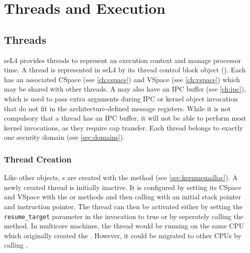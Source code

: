 %
%
%
%

\chapter{\label{ch:threads}Threads and Execution}

\section{Threads}
\label{sec:threads}

seL4 provides threads to represent an execution context and manage
processor time. A thread is represented in seL4 by its thread control block
object (). Each  has an associated CSpace (see
\autoref{ch:cspace}) and VSpace (see \autoref{ch:vspace}) which
may be shared with other threads. A  may also have an IPC buffer
(see  \autoref{ch:ipc}), which is used to pass extra arguments during IPC
or kernel object invocation that do not fit in the architecture-defined message
registers. While it is not compulsory that a thread has an IPC buffer,
it will not be able to perform most kernel invocations, as they require
cap transfer.
Each thread belongs to exactly one security domain (see 
\autoref{sec:domains}).

\subsection{Thread Creation}
\label{sec:thread_creation}

Like other objects, s are created with the
 method (see
\autoref{sec:kernmemalloc}). A newly created thread is initially inactive. It
is configured by setting its CSpace and VSpace with the
or  methods and then calling
 with an initial stack pointer and instruction
pointer. The thread can then be activated either by setting the
\texttt{resume\_target} parameter in the  invocation to true
or by seperately calling the  method. In multicore machines, the thread
would be running on the same CPU which originally created the . However, it could be migrated to other CPUs
by calling .


